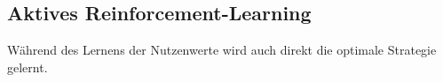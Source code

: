 \subsection{Aktives Reinforcement-Learning}
\label{aktivesRL}
Während des Lernens der Nutzenwerte wird auch direkt die optimale Strategie gelernt.\\